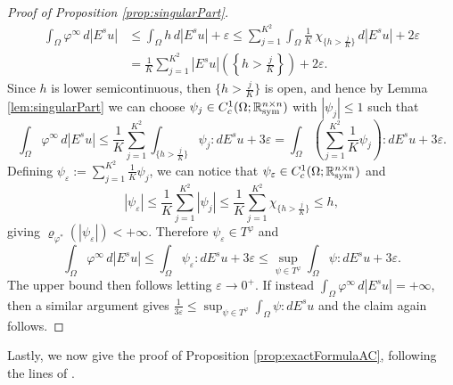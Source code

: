 \documentclass[a4paper,11pt,oneside,notitlepage]{article}
\numberwithin{equation}{section}
\def\R{\mathbb{R}}
\def\sym{{\rm sym}}
\newcommand{\e}{\varepsilon}
\newcommand{\vphi}{\varphi}
\newcommand{\vrho}{\varrho}
\begin{document}
\begin{proof}[Proof of Proposition \ref{prop:singularPart}]
    \begin{equation*}
    \begin{aligned}
        \int_\Omega \vphi^\infty \, d|E^su|
        &\le \int_\Omega h \, d|E^su| + \e
        \le \sum_{j = 1}^{K^2} \int_\Omega \frac{1}{K} \, \chi_{\{h > \tfrac{j}{K}\}} \, d|E^su| + 2\e \\
        &= \frac{1}{K} \sum_{j = 1}^{K^2} |E^su|\left(\left\{h > \frac{j}{K}\right\}\right) + 2\e.
    \end{aligned}
    \end{equation*}
    Since $h$ is lower semicontinuous, then $\{h > \tfrac{j}{K}\}$ is open, and hence by Lemma \ref{lem:singularPart} we can choose $\psi_j \in  C^1_c(\Omega; \R^{n \times n}_\sym)$ with $|\psi_j| \le 1$ such that 
    \begin{equation*}
        \int_\Omega \vphi^\infty \, d|E^su|
        \le \frac{1}{K} \sum_{j = 1}^{K^2} \int_{\{h > \tfrac{j}{K}\}} \psi_j : dE^su + 3\e
        = \int_\Omega \left(\sum_{j = 1}^{K^2} \frac{1}{K} \psi_j \right) : dE^su + 3\e.
    \end{equation*}
    Defining $\psi_\e := \sum_{j = 1}^{K^2} \tfrac{1}{K} \psi_j$, we can notice that $\psi_\e \in  C^1_c(\Omega; \R^{n \times n}_\sym)$ and 
    \begin{equation*}
        |\psi_\e| \le \frac{1}{K} \sum_{j = 1}^{K^2} |\psi_j| \le \frac{1}{K} \sum_{j = 1}^{K^2} \chi_{\{h > \frac{j}{K}\}} \le h,
    \end{equation*}
    giving $\vrho_{\vphi^*}(|\psi_\e|) < +\infty$. Therefore $\psi_\e \in T^\vphi$ and 
    \begin{equation*}
        \int_\Omega \vphi^\infty \, d|E^su|
        \le \int_\Omega \psi_\e : dE^su + 3\e
        \le \sup_{\psi \in T^\vphi} \int_\Omega \psi : dE^su +3\e.
    \end{equation*}
    The upper bound then follows letting $\e \to 0^+$. If instead $\int_\Omega \vphi^\infty \, d|E^su| = +\infty$, then a similar argument gives $\tfrac{1}{3\e} \le \sup_{\psi \in T^\vphi} \int_\Omega \psi : dE^su$ and the claim again follows.
\end{proof}

Lastly, we now give the proof of Proposition \ref{prop:exactFormulaAC}, following the lines of \cite[Proposition 6.3]{EHH}.
\end{document}
